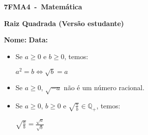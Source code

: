 \documentclass[a4paper,14pt]{article}
\begin{document}
	
	\noindent\textbf{7FMA4~-~Matemática} 
	
	\begin{center}
		\textbf{Raiz Quadrada (Versão estudante)}
	\end{center}
	
	\bigskip
	
	\noindent\textbf{Nome:} \underline{\hspace{10cm}}
    \noindent\textbf{Data:} \underline{\hspace{4cm}}
	
	\bigskip
	
	\begin{multicols}{2}
	\begin{itemize}
		\item Se $a \geq 0$ e $b \geq 0$, temos:
		\begin{center}
			$a^2 = b \Leftrightarrow \sqrt{b} = a$
		\end{center}
	    \item Se $a \geq 0$, $\sqrt{-a}$ não é um número racional.
	    \item Se $a \geq 0$, $b \geq 0$ e $\sqrt{\frac{a}{b}} \in \mathbb{Q_+}$, temos:
	    \begin{center}
	    	$\sqrt{\frac{a}{b}} = \frac{\sqrt{a}}{\sqrt{b}}$
	    \end{center}  
	\end{itemize}
	\begin{enumerate}
		

\end{enumerate}
\end{multicols}
\end{document}
